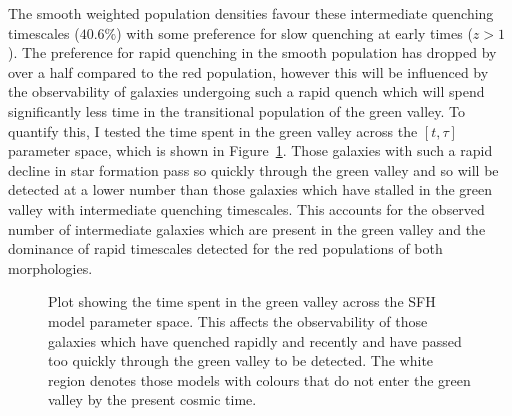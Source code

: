 The smooth weighted population densities favour these intermediate quenching timescales ($40.6\%$) with some preference for slow quenching at  early times ($z > 1$). The preference for rapid quenching in the smooth population has dropped by over a half compared to the red population, however this will be influenced by the observability of galaxies undergoing such a rapid quench which will spend significantly less time in the transitional population of the green valley. To quantify this, I tested the time spent in the green valley across the $[t, \tau]$ parameter space, which is shown in Figure~\ref{fig:timeingv}. Those galaxies with such a rapid decline in star formation pass so quickly through the green valley and so will be detected at a lower number than those galaxies which have stalled in the green valley with intermediate quenching timescales.  This accounts for the observed number of intermediate galaxies which are present in the green valley and the dominance of rapid timescales detected for the red populations of both morphologies.

\begin{figure}
\caption[Time spent in the green valley across parameter space]{Plot showing the time spent in the green valley across the SFH model parameter space. This affects the observability of those galaxies which have quenched rapidly and recently and have passed too quickly through the green valley to be detected. The white region denotes those models with colours that do not enter the green valley by the present cosmic time.}
\label{fig:timeingv}
\end{figure}

